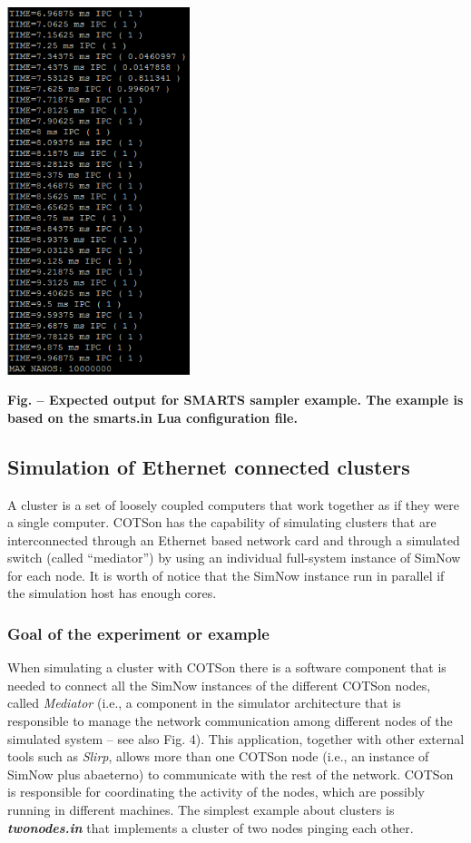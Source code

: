 \documentclass[a4paper]{article}
\newcounter{Figure}
\renewcommand\theFigure{\arabic{Figure}}
\begin{document}
{\centering 
\includegraphics[width=2.0917in,height=4.2138in]{img38.png}
\par}

{\centering{}\sffamily\bfseries
Fig.
\stepcounter{Figure}{\theFigure} -- Expected output for SMARTS sampler
example. The example is based on the smarts.in Lua configuration file.
\par}

\subsection[Simulation of Ethernet connected
clusters]{\foreignlanguage{english}{Simulation of Ethernet connected
c}lusters}
{
A cluster is a set of loosely coupled computers that work together as if
they were a single computer. COTSon has the capability of simulating
clusters that are interconnected through an Ethernet based network card
and through a simulated switch (called
{\textquotedblleft}mediator{\textquotedblright}) by using an individual
full-system instance of SimNow for each node. It is worth of notice
that the SimNow instance run in parallel if the simulation host has
enough cores.}

\subsubsection[Goal of the experiment or example]{\rmfamily Goal of the
experiment or example}
{
When simulating a cluster with COTSon there is a software component that
is needed to connect all the SimNow instances of the different COTSon
nodes, called \textit{Mediator }(i.e., a component in the simulator
architecture that is responsible to manage the network communication
among different nodes of the simulated system -- see also Fig. 4). This
application, together with other external tools such as \textit{Slirp},
allows more than one COTSon node (i.e., an instance of SimNow plus
abaeterno) to communicate with the rest of the network. COTSon is
responsible for coordinating the activity of the nodes, which are
possibly running in different machines. The simplest example about
clusters is \textbf{\textit{twonodes.in}} that implements a cluster of
two nodes pinging each other.}
\end{document}
